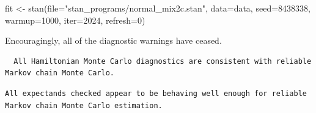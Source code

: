 \documentclass[
  letterpaper,
  DIV=11,
  numbers=noendperiod]{scrartcl}
\newenvironment{Shaded}{\begin{snugshade}}{\end{snugshade}}
\newcommand{\AttributeTok}[1]{\textcolor[rgb]{0.40,0.45,0.13}{#1}}
\newcommand{\ConstantTok}[1]{\textcolor[rgb]{0.56,0.35,0.01}{#1}}
\newcommand{\DecValTok}[1]{\textcolor[rgb]{0.68,0.00,0.00}{#1}}
\newcommand{\FunctionTok}[1]{\textcolor[rgb]{0.28,0.35,0.67}{#1}}
\newcommand{\NormalTok}[1]{\textcolor[rgb]{0.00,0.23,0.31}{#1}}
\newcommand{\OtherTok}[1]{\textcolor[rgb]{0.00,0.23,0.31}{#1}}
\newcommand{\SpecialCharTok}[1]{\textcolor[rgb]{0.37,0.37,0.37}{#1}}
\newcommand{\StringTok}[1]{\textcolor[rgb]{0.13,0.47,0.30}{#1}}
\begin{document}
\begin{Shaded}
\begin{Highlighting}[]
\NormalTok{fit }\OtherTok{\textless{}{-}} \FunctionTok{stan}\NormalTok{(}\AttributeTok{file=}\StringTok{"stan\_programs/normal\_mix2c.stan"}\NormalTok{,}
            \AttributeTok{data=}\NormalTok{data, }\AttributeTok{seed=}\DecValTok{8438338}\NormalTok{,}
            \AttributeTok{warmup=}\DecValTok{1000}\NormalTok{, }\AttributeTok{iter=}\DecValTok{2024}\NormalTok{, }\AttributeTok{refresh=}\DecValTok{0}\NormalTok{)}
\end{Highlighting}
\end{Shaded}

Encouragingly, all of the diagnostic warnings have ceased.

\begin{Shaded}
\end{Shaded}

\begin{verbatim}
  All Hamiltonian Monte Carlo diagnostics are consistent with reliable
Markov chain Monte Carlo.
\end{verbatim}

\begin{Shaded}
\end{Shaded}

\begin{verbatim}
All expectands checked appear to be behaving well enough for reliable
Markov chain Monte Carlo estimation.
\end{verbatim}
\end{document}
